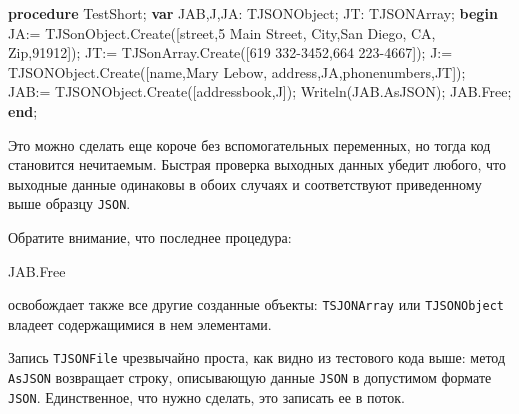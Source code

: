 \documentclass[
]{article}
\newenvironment{Shaded}{}{}
\newcommand{\DecValTok}[1]{\textcolor[rgb]{0.25,0.63,0.44}{#1}}
\newcommand{\KeywordTok}[1]{\textcolor[rgb]{0.00,0.44,0.13}{\textbf{#1}}}
\newcommand{\NormalTok}[1]{#1}
\newcommand{\StringTok}[1]{\textcolor[rgb]{0.25,0.44,0.63}{#1}}
\begin{document}
\begin{Shaded}
\begin{Highlighting}[]
\KeywordTok{procedure}\NormalTok{ TestShort;}
\KeywordTok{var}
\NormalTok{  JAB,J,JA: TJSONObject;}
\NormalTok{  JT: TJSONArray;}
\KeywordTok{begin}
\NormalTok{  JA:= TJSonObject.Create([}\StringTok{\textquotesingle{}street\textquotesingle{}}\NormalTok{,}\StringTok{\textquotesingle{}5 Main Street\textquotesingle{}}\NormalTok{,}
                          \StringTok{\textquotesingle{}City\textquotesingle{}}\NormalTok{,}\StringTok{\textquotesingle{}San Diego, CA\textquotesingle{}}\NormalTok{,}
                          \StringTok{\textquotesingle{}Zip\textquotesingle{}}\NormalTok{,}\DecValTok{91912}\NormalTok{]);}
\NormalTok{  JT:= TJSonArray.Create([}\StringTok{\textquotesingle{}619 332{-}3452\textquotesingle{}}\NormalTok{,}\StringTok{\textquotesingle{}664 223{-}4667\textquotesingle{}}\NormalTok{]);}
\NormalTok{  J:= TJSONObject.Create([}\StringTok{\textquotesingle{}name\textquotesingle{}}\NormalTok{,}\StringTok{\textquotesingle{}Mary Lebow\textquotesingle{}}\NormalTok{,}
                          \StringTok{\textquotesingle{}address\textquotesingle{}}\NormalTok{,JA,}\StringTok{\textquotesingle{}phonenumbers\textquotesingle{}}\NormalTok{,JT]);}
\NormalTok{  JAB:= TJSONObject.Create([}\StringTok{\textquotesingle{}addressbook\textquotesingle{}}\NormalTok{,J]);}
\NormalTok{  Writeln(JAB.AsJSON);}
\NormalTok{  JAB.Free;}
\KeywordTok{end}\NormalTok{;}
\end{Highlighting}
\end{Shaded}

Это можно сделать еще короче без вспомогательных переменных, но тогда
код становится нечитаемым. Быстрая проверка выходных данных убедит
любого, что выходные данные одинаковы в обоих случаях и соответствуют
приведенному выше образцу \texttt{JSON}.

Обратите внимание, что последнее процедура:

\begin{Shaded}
\begin{Highlighting}[]
\NormalTok{JAB.Free}
\end{Highlighting}
\end{Shaded}

освобождает также все другие созданные объекты: \texttt{TSJONArray} или
\texttt{TJSONObject} владеет содержащимися в нем элементами.

Запись \texttt{TJSONFile} чрезвычайно проста, как видно из тестового
кода выше: метод \texttt{AsJSON} возвращает строку, описывающую данные
\texttt{JSON} в допустимом формате \texttt{JSON}. Единственное, что
нужно сделать, это записать ее в поток.
\end{document}
